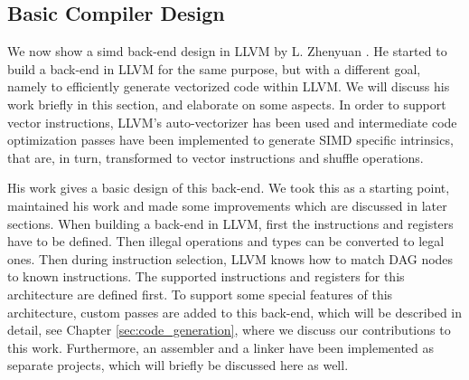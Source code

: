  


\subsection{Basic Compiler Design}\label{sec:basic_compiler_design}
We now show a simd back-end design in LLVM by L. Zhenyuan \cite{liu_zhenyuan}. He started to build a back-end in LLVM for the same purpose, but with a different goal, namely to efficiently generate vectorized code within LLVM. We will discuss his work briefly in this section, and elaborate on some aspects. In order to support vector instructions, LLVM's auto-vectorizer has been used and intermediate code optimization passes have been implemented to generate SIMD specific intrinsics, that are, in turn, transformed to vector instructions and shuffle operations. 

His work gives a basic design of this back-end. We took this as a starting point, maintained his work and made some improvements which are discussed in later sections. When building a back-end in LLVM, first the instructions and registers have to be defined. Then illegal operations and types can be converted to legal ones. Then during instruction selection, LLVM knows how to match DAG nodes to known instructions. The supported instructions and registers for this architecture are defined first. To support some special features of this architecture, custom passes are added to this back-end, which will be described in detail, see Chapter \ref{sec:code_generation}, where we discuss our contributions to this work. Furthermore, an assembler and a linker have been implemented as separate projects, which will briefly be discussed here as well.

